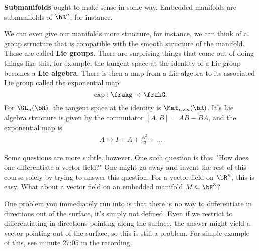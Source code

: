 \textbf{Submanifolds} ought to make sense in some way. Embedded manifolds are submanifolds of $\bR^n$, for instance.

We can even give our manifolds more structure, for instance, we can think of a group structure that is compatible with the smooth structure of the manifold. These are called \textbf{Lie groups}. There are surprising things that come out of doing things like this, for example, the tangent space at the identity of a Lie group becomes a \textbf{Lie algebra}. There is then a map from a Lie algebra to its associated Lie group called the exponential map:
\begin{equation}
	\exp: \frakg \to \frakG.
\end{equation}
For $\GL_n(\bR)$, the tangent space at the identity is $\Mat_{n\times n}(\bR)$. It's Lie algebra structure is given by the commutator $[A,B] = AB - BA$, and the exponential map is
\begin{align*}
	A \mapsto I + A + \frac{A^2}{2!} + ...
\end{align*}

\bigskip

Some questions are more subtle, however. One such question is this: "How does one differentiate a vector field?" One might go away and invent the rest of this course solely by trying to answer this question. For a vector field on $\bR^n$, this is easy. What about a vector field on an embedded manifold $M \subseteq \bR^3$? 

One problem you immediately run into is that there is no way to differentiate in directions out of the surface, it's simply not defined. Even if we restrict to differentiating in directions pointing along the surface, the answer might yield a vector pointing out of the surface, so this is still a problem. For simple example of this, see minute 27:05 in the recording.

